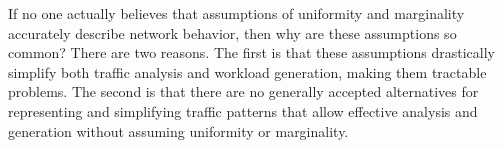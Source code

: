 \documentclass[twocolumn,final]{svjour3}
\begin{document}

If no one actually believes that assumptions of uniformity and marginality accurately describe network behavior, then why are these assumptions so common?
There are two reasons.
The first is that these assumptions drastically simplify both traffic analysis and workload generation, making them tractable problems.
The second is that there are no generally accepted alternatives for representing and simplifying traffic patterns that allow effective analysis and generation without assuming uniformity or marginality.

\end{document}
